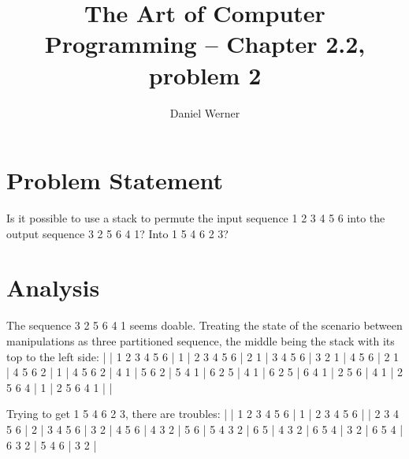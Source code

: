 \documentclass{article}
\title{The Art of Computer Programming -- Chapter 2.2, problem 2}
\author{Daniel Werner}
\begin{document}
\maketitle

\section*{
    Problem Statement
}

Is it possible to use a stack to permute the input sequence 1 2 3 4 5 6 into the output sequence 3 2 5 6 4 1?  Into 1 5 4 6 2 3?

\section*{
    Analysis
}

The sequence 3 2 5 6 4 1 seems doable.  Treating the state of the scenario between manipulations as three partitioned sequence, the middle being the stack with its top to the left side:
\newline
| | 1 2 3 4 5 6
\newline
| 1 | 2 3 4 5 6
\newline
| 2 1 | 3 4 5 6
\newline
| 3 2 1 | 4 5 6
 | 2 1 | 4 5 6
 2 | 1 | 4 5 6
 2 | 4 1 | 5 6
 2 | 5 4 1 | 6
 2 5 | 4 1 | 6
 2 5 | 6 4 1 |
 2 5 6 | 4 1 |
 2 5 6 4 | 1 |
 2 5 6 4 1 | |
\newline

Trying to get 1 5 4 6 2 3, there are troubles:
\newline
| | 1 2 3 4 5 6
\newline
| 1 | 2 3 4 5 6
 | | 2 3 4 5 6
 | 2 | 3 4 5 6
 | 3 2 | 4 5 6
 | 4 3 2 | 5 6
 | 5 4 3 2 | 6
 5 | 4 3 2 | 6
 5 4 | 3 2 | 6
 5 4 | 6 3 2 |
 5 4 6 | 3 2 |
\end{document}
